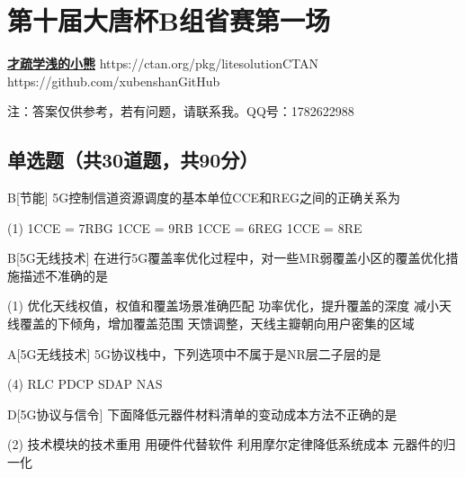 \chapter{第十届大唐杯B组省赛第一场}
\fancyhead[R]{\color{H6}\kaishu\rightmark\,}

\date{2023年4月08日}{}{\href{https://qm.qq.com/q/UPbGudx8cK}{\textbf{才疏学浅的小熊}}}
{}
{https://ctan.org/pkg/litesolution}{CTAN}
{https://github.com/xubenshan}{GitHub}

注：答案仅供参考，若有问题，请联系我。QQ号：1782622988

\section{单选题（共30道题，共90分）}



\begin{choice}{B}[节能]
    5G控制信道资源调度的基本单位CCE和REG之间的正确关系为
    \begin{tasks}(1)
        \task 1CCE = 7RBG
        \task 1CCE = 9RB
        \task 1CCE = 6REG
        \task 1CCE = 8RE
    \end{tasks}
\end{choice}


\begin{choice}{B}[5G无线技术]
    在进行5G覆盖率优化过程中，对一些MR弱覆盖小区的覆盖优化措施描述不准确的是
    \begin{tasks}(1)
        \task 优化天线权值，权值和覆盖场景准确匹配
        \task 功率优化，提升覆盖的深度
        \task 减小天线覆盖的下倾角，增加覆盖范围
        \task 天馈调整，天线主瓣朝向用户密集的区域
    \end{tasks}
\end{choice}




\begin{choice}{A}[5G无线技术]
    5G协议栈中，下列选项中不属于是NR层二子层的是
    \begin{tasks}(4)
        \task RLC
        \task PDCP
        \task SDAP
        \task NAS
    \end{tasks}
\end{choice}


\begin{choice}{D}[5G协议与信令]
    下面降低元器件材料清单的变动成本方法不正确的是
    \begin{tasks}(2)
        \task 技术模块的技术重用
        \task 用硬件代替软件
        \task 利用摩尔定律降低系统成本
        \task 元器件的归一化
    \end{tasks}
\end{choice}

